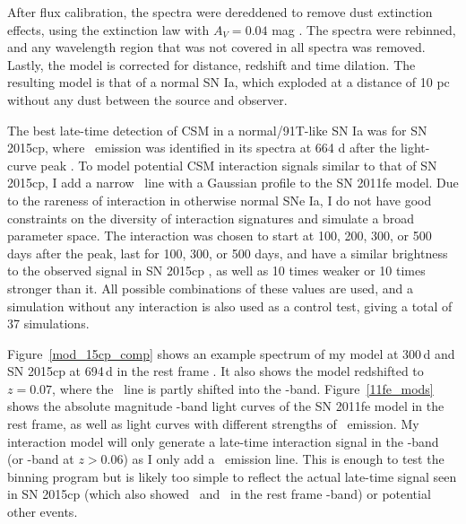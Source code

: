 \documentclass[a4paper,oneside,12pt, class=Latex/Classes/PhDthesisPSnPDF, crop=false]{standalone}
\begin{document}
After flux calibration, the spectra were dereddened to remove dust extinction effects, using the \citet{ccm89_extinction_law} extinction law with $A_V = 0.04$ mag \citep{extinction_Av}. The spectra were rebinned, and any wavelength region that was not covered in all spectra was removed. Lastly, the model is corrected for distance, redshift and time dilation. The resulting model is that of a normal SN Ia, which exploded at a distance of 10 pc without any dust between the source and observer.

 The best late-time detection of CSM in a normal/91T-like SN Ia was for SN 2015cp, where \Halpha\ emission was identified in its spectra at 664 d after the light-curve peak \citep{2015cp}. To model potential CSM interaction signals similar to that of SN 2015cp, I add a narrow \Halpha~line with a Gaussian profile to the SN 2011fe model. Due to the rareness of interaction in otherwise normal SNe Ia, I do not have good constraints on the diversity of interaction signatures and simulate a broad parameter space. The interaction was chosen to start at 100, 200, 300, or 500 days after the peak, last for 100, 300, or 500 days, and have a similar brightness to the observed signal in SN 2015cp \citep{2015cp}, as well as 10 times weaker or 10 times stronger than it. All possible combinations of these values are used, and a simulation without any interaction is also used as a control test, giving a total of 37 simulations.

Figure~\ref{mod_15cp_comp} shows an example spectrum of my model at 300\,d and SN 2015cp at 694\,d in the rest frame \citep{2015cp}. It also shows the model redshifted to $z = 0.07$, where the \Halpha~line is partly shifted into the \ztfi-band. Figure~\ref{11fe_mods} shows the absolute magnitude \ztfr\ztfi-band light curves of the SN 2011fe model in the rest frame, as well as light curves with different strengths of \Halpha~emission. My interaction model will only generate a late-time interaction signal in the \ztfr-band (or \ztfi-band at $z > 0.06$) as I only add a \Halpha\ emission line. This is enough to test the binning program but is likely too simple to reflect the actual late-time signal seen in SN 2015cp (which also showed \OI\ and \CaII\ in the rest frame \ztfi-band) or potential other events.
\end{document}
